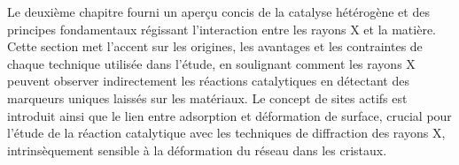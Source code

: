 \begin{table}[!htb]
\centering
{}
    \caption{
        Techniques utilisées dans le cadre de cette thèse employant les rayons X.
    }
    \label{tab:TechniquesFr}
\end{table}

Le deuxième chapitre fourni un aperçu concis de la catalyse hétérogène et des principes fondamentaux régissant l'interaction entre les rayons X et la matière.
Cette section met l'accent sur les origines, les avantages et les contraintes de chaque technique utilisée dans l'étude, en soulignant comment les rayons X peuvent observer indirectement les réactions catalytiques en détectant des marqueurs uniques laissés sur les matériaux.
Le concept de sites actifs est introduit ainsi que le lien entre adsorption et déformation de surface, crucial pour l'étude de la réaction catalytique avec les techniques de diffraction des rayons X, intrinsèquement sensible à la déformation du réseau dans les cristaux.

